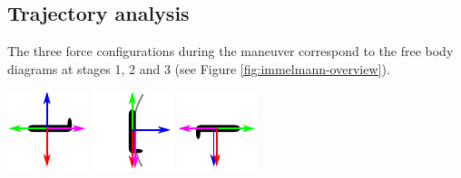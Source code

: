 \subsection{Trajectory analysis} 
The three force configurations during the maneuver correspond to the free body diagrams at stages 1, 2 and 3 (see Figure \ref{fig:immelmann-overview}). \vspace{0.5cm}

	\includegraphics[width=0.3\linewidth]{figures/free-body-1.pdf} \hfill
	\label{fig:free-body-1}
		\includegraphics[width=0.3\linewidth]{figures/free-body-2.pdf}\hfill
	\label{fig:free-body-2}
		\includegraphics[width=0.3\linewidth]{figures/free-body-3.pdf}
	\label{fig:free-body-3}
	\vspace{0.5cm}
	\vspace{0.25cm}

